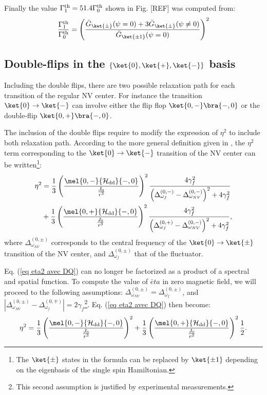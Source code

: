 \documentclass[a4paper,11pt]{report}
\begin{document}
Finally the value $\Gamma_1^{\rm th}= 51.4 \Gamma_0^{\rm th}$ shown in Fig. [REF] was computed from:
\begin{equation}
\frac{\Gamma_1^{\rm th}}{\Gamma_0^{\rm th}}=\left(\frac{\bar G_{\ket{\pm}}(\psi=0) + 3 \bar G_{\ket{\pm}}(\psi\neq 0) }{\bar G_{\ket{\pm 1}}(\psi=0)}\right)^2
\end{equation}
\subsection{Double-flips in the $\{ \ket{0}, \ket{+}, \ket{-}\}$ basis}
Including the double flips, there are two possible relaxation path for each transition of the regular NV center. For instance the transition $\ket{0} \to \ket{-}$ can involve either the flip flop $\ket{0,-} \bra{-,0}$ or the double-flip $\ket{0,+} \bra{-,0}$.

The inclusion of the double flips require to modify the  expression of $\eta^2$ to include both relaxation path. According to the more general definition given in \citep{choi2017depolarization}, the $\eta^2$ term corresponding to the $\ket{0} \to \ket{-}$ transition of the NV center can be written\footnote{The $\ket{\pm}$ states in the formula can be replaced by $\ket{\pm 1}$ depending on the eigenbasis of the single spin Hamiltonian.}:
\begin{align}
\label{eq eta2 avec DQ}
\eta^2&=\frac{1}{3} \left(\frac{\mel{0,-}{\mathcal{H_{\rm dd}}}{-,0}}{\frac{J_0}{r^3}}\right)^2 \frac{4\gamma_f^2}{\left(\Delta_{\omega_f}^{(0,-)} - \Delta_{\omega_{NV}}^{(0,-)}\right)^2+4\gamma_f^2} \nonumber\\
&+\frac{1}{3} \left(\frac{\mel{0,+}{\mathcal{H_{\rm dd}}}{-,0}}{\frac{J_0}{r^3}}\right)^2 \frac{4\gamma_f^2}{\left(\Delta_{\omega_f}^{(0,+)} - \Delta_{\omega_{NV}}^{(0,-)}\right)^2+4\gamma_f^2},
\end{align}
where $\Delta_{\omega_{NV}}^{(0,\pm)}$ corresponds to the central frequency of the $\ket{0} \to \ket{\pm}$ transition of the NV center, and $\Delta_{\omega_{f}}^{(0,\pm)}$ that of the fluctuator.

Eq. (\ref{eq eta2 avec DQ}) can no longer be factorized as a product of a spectral and spatial function. To compute the value of $\bar eta$ in zero magnetic field, we will proceed to the following assumptions: $\Delta_{\omega_{NV}}^{(0,\pm)}=\Delta_{\omega_{f}}^{(0,\pm)}$, and $|\Delta_{\omega_{NV}}^{(0,\pm)}-\Delta_{\omega_{f}}^{(0,\mp)}|=2 \gamma_f$\footnote{This second assumption is justified by experimental measurements.}. Eq. (\ref{eq eta2 avec DQ}) then become:
\begin{equation}
\eta^2=\frac{1}{3} \left(\frac{\mel{0,-}{\mathcal{H_{\rm dd}}}{-,0}}{\frac{J_0}{r^3}}\right)^2 
+\frac{1}{3} \left(\frac{\mel{0,+}{\mathcal{H_{\rm dd}}}{-,0}}{\frac{J_0}{r^3}}\right)^2 \frac{1}{2}.
\end{equation}
\end{document}
